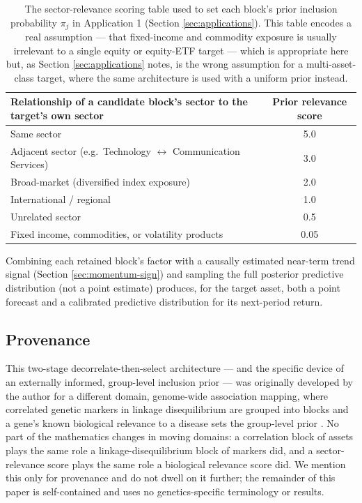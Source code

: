 \documentclass[11pt]{article}
\begin{document}
\begin{table}[htbp]
\centering
\begin{tabular}{@{}lc@{}}
\toprule
Relationship of a candidate block's sector to the target's own sector & Prior relevance score \\
\midrule
Same sector                                   & 5.0 \\
Adjacent sector (e.g.\ Technology $\leftrightarrow$ Communication Services) & 3.0 \\
Broad-market (diversified index exposure)     & 2.0 \\
International / regional                      & 1.0 \\
Unrelated sector                               & 0.5 \\
Fixed income, commodities, or volatility products & 0.05 \\
\bottomrule
\end{tabular}
\caption{The sector-relevance scoring table used to set each block's prior
inclusion probability $\pi_j$ in Application 1 (Section
\ref{sec:applications}). This table encodes a real assumption --- that
fixed-income and commodity exposure is usually irrelevant to a single
equity or equity-ETF target --- which is appropriate here but, as Section
\ref{sec:applications} notes, is the wrong assumption for a
multi-asset-class target, where the same architecture is used with a
uniform prior instead.}
\label{tab:relevance}
\end{table}

Combining each retained block's factor with a causally estimated
near-term trend signal (Section \ref{sec:momentum-sign}) and sampling the
full posterior predictive distribution (not a point estimate) produces,
for the target asset, both a point forecast and a calibrated predictive
distribution for its next-period return.

\subsection*{Provenance}
This two-stage decorrelate-then-select architecture --- and the specific
device of an externally informed, group-level inclusion prior --- was
originally developed by the author for a different domain, genome-wide
association mapping, where correlated genetic markers in linkage
disequilibrium are grouped into blocks and a gene's known biological
relevance to a disease sets the group-level prior \citep{johnston2015}.
No part of the mathematics changes in moving domains: a correlation block
of assets plays the same role a linkage-disequilibrium block of markers
did, and a sector-relevance score plays the same role a biological
relevance score did. We mention this only for provenance and do not dwell
on it further; the remainder of this paper is self-contained and uses no
genetics-specific terminology or results.
\end{document}
